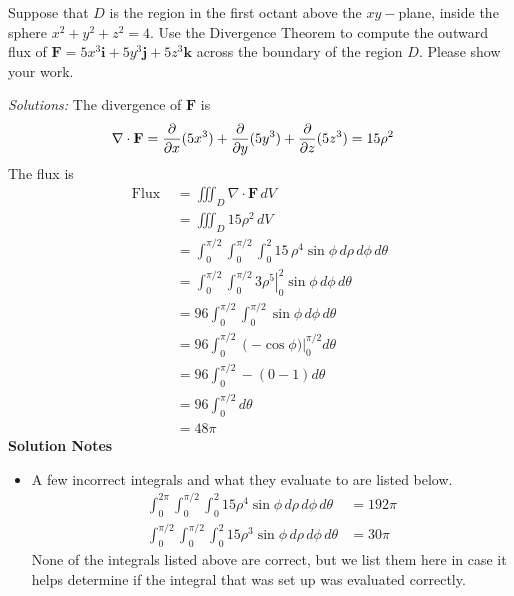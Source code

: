    \fi
    
\fi


\ifnum {}
    \question[4] Suppose that $D$ is the region in the first octant above the $xy-$plane, inside the sphere $x^2+y^2 + z^2 = 4$. Use the Divergence Theorem to compute the outward flux of $\mathbf F = 5x^3\mathbf i + 5y^3\mathbf j + 5z^3\mathbf k$ across the boundary of the region $D$. Please show your work. 
    \ifnum {} {\color{DarkBlue}  \textit{Solutions:} 
    The divergence of $\mathbf F$ is 
    \begin{align}
        \nabla \cdot \mathbf F 
        &= \frac{\partial}{\partial x}(5x^3) + \frac{\partial}{\partial y}( 5y^3) + \frac{\partial}{\partial z} (5z^3) = 15\rho^2
    \end{align}
    The flux is
    \begin{align}
        \text{Flux } &= \iiint_D \nabla \cdot \mathbf F \, dV \\
        &= \iiint_D  15\rho^2 \, dV \\
        &= \int_0^{\pi/2} \int_0^{\pi/2} \int_0^2 15 \, \rho^4 \sin\phi \, d\rho \, d\phi \, d\theta \\
        &=  \int_0^{\pi/2} \int_0^{\pi/2}  \left. 3 \rho^5 \right|_0^2 \sin\phi \,  d\phi \, d\theta \\
        &=  96\int_0^{\pi/2} \int_0^{\pi/2}  \sin\phi \,  d\phi \, d\theta \\
        &=  96 \int_0^{\pi/2} \left(-\cos \phi) \right|_0^{\pi/2} d\theta\\
        &=  96 \int_0^{\pi/2} -(0-1) d\theta\\
        &=  96 \int_0^{\pi/2} d\theta\\
        &= 48\pi
    \end{align}
        \textbf{Solution Notes}
    \begin{itemize}
        \item A few incorrect integrals and what they evaluate to are listed below. 
        \begin{align}
            \int_0^{2\pi} \int_0^{\pi/2} \int_0^2 15 \rho^4 \sin\phi \, d\rho \, d\phi \, d\theta &= 192 \pi \\
            \int_0^{\pi/2} \int_0^{\pi/2} \int_0^2 15 \rho^3 \sin\phi \, d\rho \, d\phi \, d\theta &= 30 \pi 
        \end{align}
        None of the integrals listed above are correct, but we list them here in case it helps determine if the integral that was set up was evaluated correctly. 
    \end{itemize}    
    } 
   \else
   \fi
\fi

